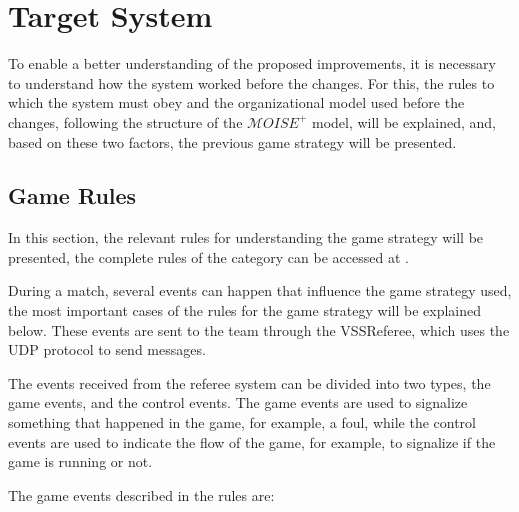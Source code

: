 \def \MOISEp {$\mathcal{M}OISE^+$ }

\chapter{Target System}
\label{ch:target_system}

To enable a better understanding of the proposed improvements, it is necessary to understand how the system worked before the changes. For this, the rules to which the system must obey and the organizational model used before the changes, following the structure of the \MOISEp model, will be explained, and, based on these two factors, the previous game strategy will be presented.

\section{Game Rules}
\label{sec:rules}

In this section, the relevant rules for understanding the game strategy will be presented, the complete rules of the category can be accessed at \cite{RulesVSSS}.

During a match, several events can happen that influence the game strategy used, the most important cases of the rules for the game strategy will be explained below. These events are sent to the team through the VSSReferee, which uses the UDP protocol to send messages.

The events received from the referee system can be divided into two types, the game events, and the control events. The game events are used to signalize something that happened in the game, for example, a foul, while the control events are used to indicate the flow of the game, for example, to signalize if the game is running or not.

The game events described in the rules are:

